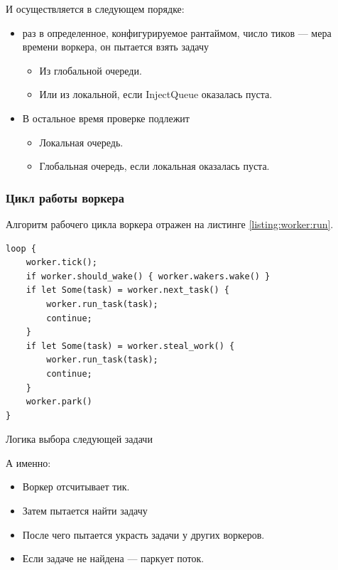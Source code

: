 И осуществляется в следующем порядке:

\begin{itemize}
    \item раз в определенное, конфигурируемое рантаймом, число тиков --- мера времени воркера, он пытается взять задачу
    \begin{itemize}
        \item Из глобальной очереди.
        \item Или из локальной, если InjectQueue оказалась пуста.
    \end{itemize}
    \item В остальное время проверке подлежит
    \begin{itemize}
        \item Локальная очередь.
        \item Глобальная очередь, если локальная оказалась пуста.
    \end{itemize}
\end{itemize}

\subsubsection{Цикл работы воркера}

Алгоритм рабочего цикла воркера отражен на листинге \ref{listing:worker:run}.

\begin{listing}[H]
    \begin{verbatim}
loop {
    worker.tick();
    if worker.should_wake() { worker.wakers.wake() }
    if let Some(task) = worker.next_task() {
        worker.run_task(task);
        continue;
    }
    if let Some(task) = worker.steal_work() {
        worker.run_task(task);
        continue;
    }
    worker.park()
}
    \end{verbatim}

    \caption{Логика выбора следующей задачи}
    \label{listing:worker:run}
\end{listing}

А именно:

\begin{itemize}
    \item Воркер отсчитывает тик.
    \item Затем пытается найти задачу
    \item После чего пытается украсть задачи у других воркеров.
    \item Если задаче не найдена --- паркует поток.
\end{itemize}

